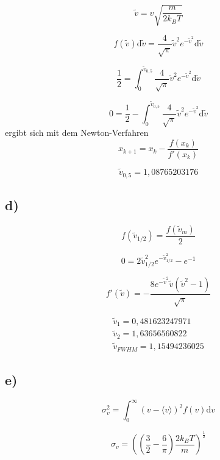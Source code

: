 \begin{equation}
  \tilde{v} = v \sqrt{\frac{m}{2k_BT}}
\end{equation}

\begin{equation}
  f\left(\tilde{v}\right) \text{d}\tilde{v} = \frac{4}{\sqrt{\pi}}\tilde{v}^2 e^{-\tilde{v}^2} \text{d}\tilde{v}
\end{equation}

\begin{equation}
  \frac{1}{2}=\int^{\tilde{v}_{0,5}}_{0} \frac{4}{\sqrt{\pi}}\tilde{v}^2 e^{-\tilde{v}^2} \text{d}\tilde{v}
\end{equation}

\begin{equation}
  0=\frac{1}{2} - \int^{\tilde{v}_{0,5}}_{0} \frac{4}{\sqrt{\pi}}\tilde{v}^2 e^{-\tilde{v}^2} \text{d}\tilde{v}
\end{equation}
ergibt sich mit dem Newton-Verfahren
\begin{equation}
  x_{k+1}=x_k - \frac{f(x_k)}{f'(x_k)}
  \label{eqn:Newton}
\end{equation}

\begin{equation}
  \tilde{v}_{0,5}=1,08765203176
\end{equation}

\subsection{d)}

\begin{equation}
  f(\tilde{v}_{1/2})=\frac{f(\tilde{v}_m)}{2}
\end{equation}

\begin{equation}
  0=2\tilde{v}^2_{1/2}e^{-\tilde{v}^2_{1/2}}- e^{-1}
\end{equation}

\begin{equation}
  f'(\tilde{v})=-\frac{8 e^{-\tilde{v}^2}\tilde{v}(\tilde{v}^2-1)}{\sqrt{\pi}}
\end{equation}

\begin{gather}
  \tilde{v}_1=0,481623247971\\
  \tilde{v}_2=1,63656560822\\
  \tilde{v}_{FWHM}=1,15494236025
\end{gather}

\subsection{e)}

\begin{equation}
  \sigma^2_v=\int^{\infty}_{0} \left(v-\langle v \rangle \right)^2 f(v) \text{d}v
\end{equation}

\begin{equation}
  \sigma_v = \left(\left( \frac{3}{2}- \frac{6}{\pi}\right) \frac{2k_BT}{m}             \right)^{\frac{1}{2}}
\end{equation}
